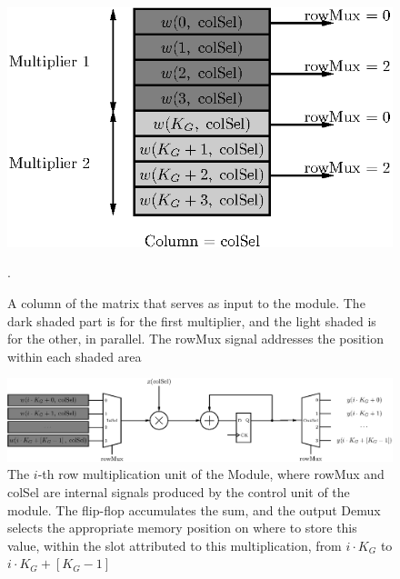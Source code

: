 \begin{figure}
    \centering
    \includegraphics[width=0.9\linewidth]{figures/mem-array-prod.eps}
    \caption[A column of the matrix that serves as input to the module]{A column of the matrix that serves as input to the module. The dark shaded part is for the first multiplier, and the light shaded is for the other, in parallel. The rowMux signal addresses the position within each shaded area}.
    \label{fig:mem-arrayprod}
\end{figure}

\begin{figure}
    \centering
    \includegraphics[width=\linewidth]{figures/array-prod.eps}
    \caption[The $i$-th row multiplication unit of the Module]{The $i$-th row multiplication unit of the Module, where rowMux and colSel are internal signals produced by the control unit of the module. The flip-flop accumulates the sum, and the output Demux selects the appropriate memory position on where to store this value, within the slot attributed to this multiplication, from $i\cdot K_G$ to $i\cdot K_G + \left[K_G-1\right]$}
    \label{fig:array-prod}
\end{figure}


